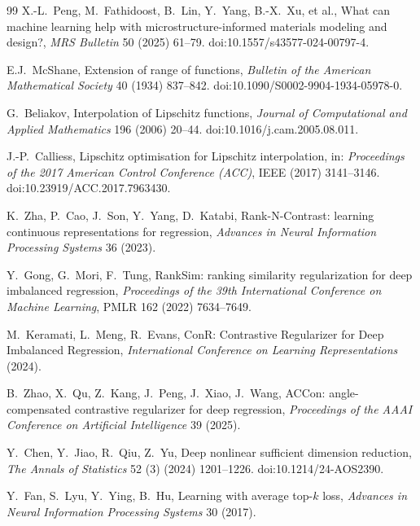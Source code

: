 \documentclass[preprint,11pt,a4paper]{elsarticle}
\begin{document}
\begin{thebibliography}{99}
X.-L.~Peng, M.~Fathidoost, B.~Lin, Y.~Yang, B.-X.~Xu, et al.,
\newblock What can machine learning help with microstructure-informed materials
modeling and design?,
\newblock \emph{MRS Bulletin} 50 (2025) 61--79.
\newblock doi:10.1557/s43577-024-00797-4.

E.J.~McShane,
\newblock Extension of range of functions,
\newblock \emph{Bulletin of the American Mathematical Society}
40 (1934) 837--842.
\newblock doi:10.1090/S0002-9904-1934-05978-0.

G.~Beliakov,
\newblock Interpolation of Lipschitz functions,
\newblock \emph{Journal of Computational and Applied Mathematics}
196 (2006) 20--44.
\newblock doi:10.1016/j.cam.2005.08.011.

J.-P.~Calliess,
\newblock Lipschitz optimisation for Lipschitz interpolation,
\newblock in: \emph{Proceedings of the 2017 American Control Conference (ACC)},
IEEE (2017) 3141--3146.
\newblock doi:10.23919/ACC.2017.7963430.

K.~Zha, P.~Cao, J.~Son, Y.~Yang, D.~Katabi,
\newblock Rank-N-Contrast: learning continuous representations for regression,
\newblock \emph{Advances in Neural Information Processing Systems} 36 (2023).

Y.~Gong, G.~Mori, F.~Tung,
\newblock RankSim: ranking similarity regularization for deep imbalanced regression,
\newblock \emph{Proceedings of the 39th International Conference on Machine Learning},
PMLR 162 (2022) 7634--7649.

M.~Keramati, L.~Meng, R.~Evans,
\newblock ConR: Contrastive Regularizer for Deep Imbalanced Regression,
\newblock \emph{International Conference on Learning Representations} (2024).

B.~Zhao, X.~Qu, Z.~Kang, J.~Peng, J.~Xiao, J.~Wang,
\newblock ACCon: angle-compensated contrastive regularizer for deep regression,
\newblock \emph{Proceedings of the AAAI Conference on Artificial Intelligence} 39 (2025).

Y.~Chen, Y.~Jiao, R.~Qiu, Z.~Yu,
\newblock Deep nonlinear sufficient dimension reduction,
\newblock \emph{The Annals of Statistics} 52 (3) (2024) 1201--1226.
\newblock doi:10.1214/24-AOS2390.

Y.~Fan, S.~Lyu, Y.~Ying, B.~Hu,
\newblock Learning with average top-$k$ loss,
\newblock \emph{Advances in Neural Information Processing Systems} 30 (2017).


\end{thebibliography}
\end{document}
